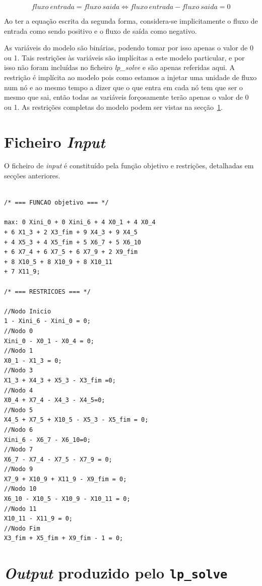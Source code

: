 \begin{displaymath}
fluxo~entrada = fluxo~saida \Leftrightarrow  fluxo~entrada - fluxo~saida = 0
\end{displaymath}


Ao ter a equação escrita da segunda forma, considera-se implicitamente o fluxo
de entrada como sendo positivo e o fluxo de saída como negativo. 

As variáveis do modelo são binárias, podendo tomar por isso apenas o valor de
0 ou 1. Tais restrições às variáveis são implícitas a este modelo particular,
e por isso não foram incluídas no ficheiro \emph{lp\_solve} e são apenas referidas aqui. A restrição é implícita ao modelo pois como estamos a injetar uma unidade de fluxo num nó e ao mesmo tempo a dizer que o que entra em cada nó tem que ser o mesmo que sai, então todas as variáveis forçosamente terão apenas o valor de 0 ou 1.
As restrições completas do modelo podem ser vistas na secção~\ref{p1:sec:fichin}.


\section{Ficheiro \emph{Input}}
\label{p1:sec:fichin}
O ficheiro de \emph{input} é constituído pela função objetivo e restrições, detalhadas
em secções anteriores.

\begin{verbatim}

/* === FUNCAO objetivo === */

max: 0 Xini_0 + 0 Xini_6 + 4 X0_1 + 4 X0_4
+ 6 X1_3 + 2 X3_fim + 9 X4_3 + 9 X4_5
+ 4 X5_3 + 4 X5_fim + 5 X6_7 + 5 X6_10
+ 6 X7_4 + 6 X7_5 + 6 X7_9 + 2 X9_fim
+ 8 X10_5 + 8 X10_9 + 8 X10_11
+ 7 X11_9;

/* === RESTRICOES === */

//Nodo Inicio
1 - Xini_6 - Xini_0 = 0;
//Nodo 0
Xini_0 - X0_1 - X0_4 = 0;
//Nodo 1
X0_1 - X1_3 = 0;
//Nodo 3
X1_3 + X4_3 + X5_3 - X3_fim =0;
//Nodo 4
X0_4 + X7_4 - X4_3 - X4_5=0;
//Nodo 5
X4_5 + X7_5 + X10_5 - X5_3 - X5_fim = 0;
//Nodo 6
Xini_6 - X6_7 - X6_10=0;
//Nodo 7
X6_7 - X7_4 - X7_5 - X7_9 = 0;
//Nodo 9
X7_9 + X10_9 + X11_9 - X9_fim = 0;
//Nodo 10
X6_10 - X10_5 - X10_9 - X10_11 = 0;
//Nodo 11
X10_11 - X11_9 = 0;
//Nodo Fim
X3_fim + X5_fim + X9_fim - 1 = 0;

\end{verbatim}

\newpage

\section{\emph{Output} produzido pelo \texttt{lp\_solve}}

